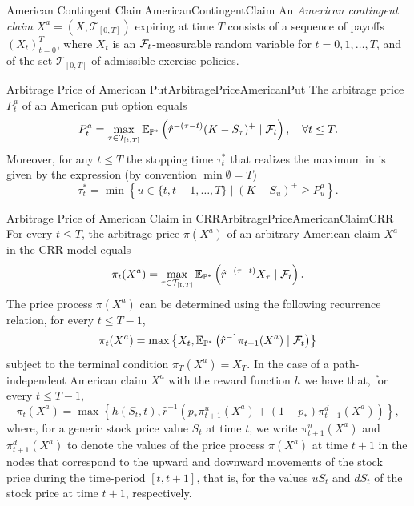 \begin{defn}{American Contingent Claim}{AmericanContingentClaim}
	An \textit{American contingent claim} $X^a = (X, \mathcal{T}_{[0,T]})$ expiring at time $T$ consists of a sequence of payoffs $(X_t)_{t=0}^T$, where $X_t$ is an $\mathcal{F}_t$-measurable random variable for $t = 0, 1, \dots, T$, and of the set $\mathcal{T}_{[0,T]}$ of admissible exercise policies.
\end{defn}

\begin{prop}{Arbitrage Price of American Put}{ArbitragePriceAmericanPut}
	The arbitrage price $P_t^a$ of an American put option equals
	\begin{equation} \label{eq:AmericanPutArbitragePrice}
		P_t^a = \max_{\tau \in \mathcal{T}_{[t,T]}} \mathbb{E}_{\mathbb{P}^*} \left( \hat{r}^{-(\tau-t)} (K - S_\tau)^+ \mid \mathcal{F}_t \right), \quad \forall t \le T.
	\end{equation}
	Moreover, for any $t \le T$ the stopping time $\tau_t^*$ that realizes the maximum in  is given by the expression (by convention $\min \emptyset = T$)
	\begin{equation} \label{eq:OptimalStoppingTime}
		\tau_t^* = \min \left\{ u \in \{t, t + 1, \dots, T\} \mid (K - S_u)^+ \ge P_u^a \right\}.
	\end{equation}
\end{prop}

\begin{prop}{Arbitrage Price of American Claim in CRR}{ArbitragePriceAmericanClaimCRR}
	For every $t \le T$, the arbitrage price $\pi(X^a)$ of an arbitrary American claim $X^a$ in the CRR model equals
	\begin{equation} \label{eq:GeneralAmericanArbitragePrice}
		\pi_t(X^a) = \max_{\tau \in \mathcal{T}_{[t,T]}} \mathbb{E}_{\mathbb{P}^*} \left( \hat{r}^{-(\tau-t)} X_\tau \mid \mathcal{F}_t \right).
	\end{equation}
	The price process $\pi(X^a)$ can be determined using the following recurrence relation, for every $t \le T - 1$,
	\begin{equation} \label{eq:SnellEnvelopeRecurrence}
		\pi_t(X^a) = \max \left\{ X_t, \mathbb{E}_{\mathbb{P}^*} \left( \hat{r}^{-1} \pi_{t+1}(X^a) \mid \mathcal{F}_t \right) \right\}
	\end{equation}
	subject to the terminal condition $\pi_T(X^a) = X_T$. In the case of a path-independent American claim $X^a$ with the reward function $h$ we have that, for every $t \le T - 1$,
	\begin{equation} \label{eq:PathIndependentRecurrence}
		\pi_t(X^a) = \max \left\{ h(S_t, t), \hat{r}^{-1} \left( p_* \pi_{t+1}^u(X^a) + (1 - p_*) \pi_{t+1}^d(X^a) \right) \right\},
	\end{equation}
	where, for a generic stock price value $S_t$ at time $t$, we write $\pi_{t+1}^u(X^a)$ and $\pi_{t+1}^d(X^a)$ to denote the values of the price process $\pi(X^a)$ at time $t + 1$ in the nodes that correspond to the upward and downward movements of the stock price during the time-period $[t, t + 1]$, that is, for the values $uS_t$ and $dS_t$ of the stock price at time $t + 1$, respectively.
\end{prop}
